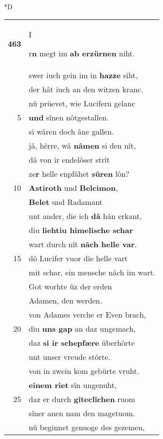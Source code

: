 \documentclass[8pt,a4paper,notitlepage]{article}
\begin{document}
\begin{table}[ht]
\begin{minipage}[t]{0.5\linewidth}
\small
\begin{center}*D
\end{center}
\begin{tabular}{rl}
\textbf{463} & \begin{large}I\end{large}r\textbf{n} megt im \textbf{ab erzürnen} niht.\\ 
 & swer iuch gein im in \textbf{hazze} siht,\\ 
 & der hât iuch an den witzen kranc.\\ 
 & nû prüevet, wie Lucifern gelanc\\ 
5 & \textbf{und} sînen nôtgestallen.\\ 
 & si wâren doch âne gallen.\\ 
 & jâ, hêrre, wâ \textbf{nâmen} si den nît,\\ 
 & dâ von ir endelôser strît\\ 
 & ze\textbf{r} helle enpfâhet \textbf{sûren} lôn?\\ 
10 & \textbf{Astiroth} und \textbf{Belcimon},\\ 
 & \textbf{Belet} und Radamant\\ 
 & unt ander, die ich \textbf{dâ} hân erkant,\\ 
 & diu \textbf{liehtiu himelische schar}\\ 
 & wart durch nît \textbf{nâch helle var}.\\ 
15 & dô Lucifer vuor die helle vart\\ 
 & mit schar, ein mensche nâch im wart.\\ 
 & Got worhte ûz der erden\\ 
 & Adamen, den werden.\\ 
 & von Adames verche er Even brach,\\ 
20 & diu \textbf{uns gap} an daz ungemach,\\ 
 & daz \textbf{si ir schepfære} überhôrte\\ 
 & unt unser vreude stôrte.\\ 
 & von in zwein kom gebürte vruht.\\ 
 & \textbf{einem riet} sîn ungenuht,\\ 
25 & daz er durch \textbf{gîteclîchen} ruom\\ 
 & sîner anen nam den magetuom.\\ 
 & nû beginnet genuoge des gezemen,\\ 

\end{tabular}
\end{minipage}
\end{table}
\end{document}
